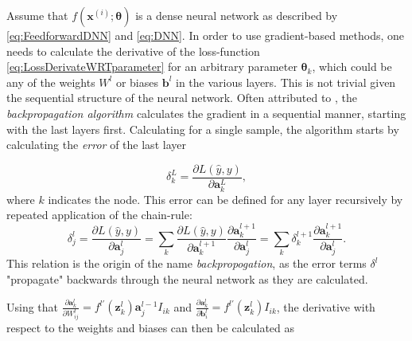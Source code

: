 
Assume that $f(\boldsymbol{x}^{(i)}; \boldsymbol{\theta})$ is a dense neural network as described by \autoref{eq:FeedforwardDNN} and \autoref{eq:DNN}. In order to use gradient-based methods, one needs to calculate the derivative of the loss-function \autoref{eq:LossDerivateWRTparameter} for an arbitrary parameter $\boldsymbol{\theta}_k$, which could be any of the weights $W^l$ or biases $\boldsymbol{b}^l$ in the various layers. This is not trivial given the sequential structure of the neural network. Often attributed to \citet{Rumelhart}, the \emph{backpropagation algorithm} calculates the gradient in a sequential manner, starting with the last layers first. Calculating for a single sample, the algorithm starts by calculating the \emph{error} of the last layer


\begin{equation}\label{eq:lastLayerError}
    \delta^L_k = \frac{\partial L(\hat{y}, y)}{\partial \boldsymbol{a}^L_k},
\end{equation}
where $k$ indicates the node. This error can be defined for any layer recursively by repeated application of the chain-rule:
\begin{equation}\label{eq:error}
    \delta^l_j = \frac{\partial L(\hat{y}, y)}{\partial \boldsymbol{a}^l_j} 
    = \sum_k \frac{\partial L(\hat{y}, y)}{\partial \boldsymbol{a}^{l+1}_k} \frac{\partial \boldsymbol{a}^{l+1}_k}{\partial \boldsymbol{a}^{l}_j}
    = \sum_k \delta^{l+1}_k \frac{\partial \boldsymbol{a}^{l+1}_k}{\partial \boldsymbol{a}^{l}_j}.
\end{equation}
This relation is the origin of the name \emph{backpropogation}, as the error terms $\delta^l$ "propagate" backwards through the neural network as they are calculated.

Using that 
$\frac{\partial \boldsymbol{a}^{l}_k}{\partial W^l_{ij}} = f^{l\prime}(\boldsymbol{z}^{l}_k)\boldsymbol{a}^{l-1}_j I_{ik}$ 
and 
$\frac{\partial \boldsymbol{a}^{l}_k}{\partial \boldsymbol{b}^l_{i}} = f^{l\prime}(\boldsymbol{z}^{l}_k) I_{ik}$, the derivative with respect to the weights and biases can then be calculated as 

